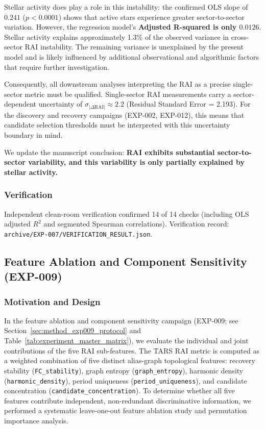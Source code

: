 Stellar activity does play a role in this instability: the confirmed OLS slope of $0.241$ ($p < 0.0001$) shows that active stars experience greater sector-to-sector variation. However, the regression model's \textbf{Adjusted R-squared is only $0.0126$}. Stellar activity explains approximately 1.3\% of the observed variance in cross-sector RAI instability. The remaining variance is unexplained by the present model and is likely influenced by additional observational and algorithmic factors that require further investigation.

Consequently, all downstream analyses interpreting the RAI as a precise single-sector metric must be qualified. Single-sector RAI measurements carry a sector-dependent uncertainty of $\sigma_{|\Delta\text{RAI}|} \approx 2.2$ (Residual Standard Error = 2.193). For the discovery and recovery campaigns (EXP-002, EXP-012), this means that candidate selection thresholds must be interpreted with this uncertainty boundary in mind.

We update the manuscript conclusion: \textbf{RAI exhibits substantial sector-to-sector variability, and this variability is only partially explained by stellar activity.}

\subsubsection{Verification}

Independent clean-room verification confirmed 14 of 14 checks (including OLS adjusted $R^2$ and segmented Spearman correlations). Verification record: \texttt{archive/EXP-007/VERIFICATION\_RESULT.json}.


\subsection{Feature Ablation and Component Sensitivity (EXP-009)} \label{sec:results_exp009}

\subsubsection{Motivation and Design}
In the feature ablation and component sensitivity campaign (EXP-009; see Section~\ref{sec:method_exp009_protocol} and Table~\ref{tab:experiment_master_matrix}), we evaluate the individual and joint contributions of the five RAI sub-features. The TARS RAI metric is computed as a weighted combination of five distinct alias-graph topological features: recovery stability (\texttt{FC\_stability}), graph entropy (\texttt{graph\_entropy}), harmonic density (\texttt{harmonic\_density}), period uniqueness (\texttt{period\_uniqueness}), and candidate concentration (\texttt{candidate\_concentration}). To determine whether all five features contribute independent, non-redundant discriminative information, we performed a systematic leave-one-out feature ablation study and permutation importance analysis.

